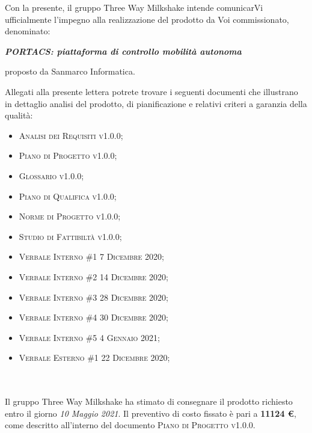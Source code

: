 \documentclass[10pt,stdletter,dateno,sigright]{newlfm}  %
\begin{document}
\begin{newlfm}


Con la presente, il gruppo Three Way Milkshake intende comunicarVi ufficialmente l'impegno alla realizzazione del prodotto da Voi commissionato, denominato:
\begin{center}
    \textbf{\textit{PORTACS: piattaforma di controllo mobilità autonoma}}
\end{center}
proposto da Sanmarco Informatica.

Allegati alla presente lettera potrete trovare i seguenti documenti che illustrano in dettaglio analisi del prodotto, di pianificazione e relativi criteri a garanzia della qualità:

\begin{itemize}
	\item \textsc{Analisi dei Requisiti v1.0.0;}
    \item \textsc{Piano di Progetto v1.0.0;}
    \item \textsc{Glossario v1.0.0;}
    \item \textsc{Piano di Qualifica v1.0.0;}
    \item \textsc{Norme di Progetto v1.0.0;}
    \item \textsc{Studio di Fattibiltà v1.0.0;}
    \item \textsc{Verbale Interno \#1 7 Dicembre 2020;}
    \item \textsc{Verbale Interno \#2 14 Dicembre 2020;}
    \item \textsc{Verbale Interno \#3 28 Dicembre 2020;}
    \item \textsc{Verbale Interno \#4 30 Dicembre 2020;}
    \item \textsc{Verbale Interno \#5 4 Gennaio 2021;}
    \item \textsc{Verbale Esterno \#1 22 Dicembre 2020;}
\end{itemize}   
\ \\
\ \\
Il gruppo Three Way Milkshake ha stimato di consegnare il prodotto richiesto entro il giorno \textit{10 Maggio 2021}. 
Il preventivo di costo fissato \`e pari a \textbf{11124  \euro}, come descritto all'interno del documento \textsc{Piano di Progetto v1.0.0}.
\\


\end{newlfm}
\end{document}
